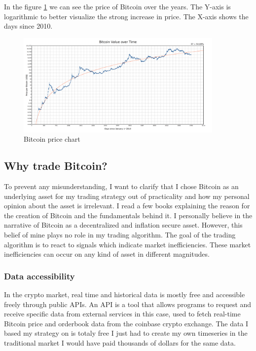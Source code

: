 \documentclass[12pt]{article}
\begin{document}
In the figure \ref{fig:bitcoin_chart} we can see the price of Bitcoin over the years. The Y-axis is logarithmic to better visualize the strong increase in price. The X-axis shows the days since 2010.
\begin{figure}
    \centering
    \includegraphics[width=0.9\textwidth]{imgs/bitcoin_price_over_years.png}
    \caption{Bitcoin price chart}
    \label{fig:bitcoin_chart}
\end{figure}



\newpage

\subsection*{Why trade Bitcoin?}
To prevent any misunderstanding, I want to clarify that I chose Bitcoin as an underlying asset for my trading strategy out of practicality and how my personal opinion about the asset is irrelevant. I read a few books explaining the reason for the creation of Bitcoin and the fundamentals behind it. I personally believe in the narrative of Bitcoin as a decentralized and inflation secure asset. However, this belief of mine plays no role in my trading algorithm. The goal of the trading algorithm is to react to signals which indicate market inefficiencies. These market inefficiencies can occur on any kind of asset in different magnitudes.
\subsubsection*{Data accessibility}
In the crypto market, real time and historical data is mostly free and accessible freely through public APIs. An API is a tool that allows programs to request and receive specific data from external services in this case, used to fetch real-time Bitcoin price and orderbook data from the coinbase crypto exchange. The data I based my strategy on is totaly free I just had to create my own timeseries in the traditional market I would have paid thousands of dollars for the same data.
\end{document}
